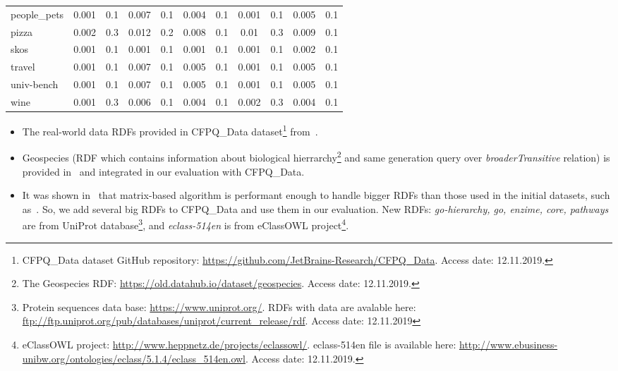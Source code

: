 {\begin{table*}[h]
\begin{tabular}{| l | c  c | c  c | c  c | c  c | c  c |}
people\_pets                & 0.001 & 0.1  & 0.007 & 0.1 & 0.004 & 0.1   & 0.001 & 0.1  & 0.005 & 0.1   \\
pizza                       & 0.002 & 0.3  & 0.012 & 0.2 & 0.008 & 0.1   & 0.01  & 0.3  & 0.009 & 0.1   \\
skos                        & 0.001 & 0.1  & 0.001 & 0.1 & 0.001 & 0.1   & 0.001 & 0.1  & 0.002 & 0.1   \\
travel                      & 0.001 & 0.1  & 0.007 & 0.1 & 0.005 & 0.1   & 0.001 & 0.1  & 0.005 & 0.1   \\
univ-bench                  & 0.001 & 0.1  & 0.007 & 0.1 & 0.005 & 0.1   & 0.001 & 0.1  & 0.005 & 0.1   \\
wine                        & 0.001 & 0.3  & 0.006 & 0.1 & 0.004 & 0.1   & 0.002 & 0.3  & 0.004 & 0.1  \\
    \hline
  \end{tabular}
\end{table*}
}

\begin{itemize}
\item The real-world data RDFs provided in CFPQ\_Data dataset\footnote{CFPQ\_Data dataset GitHub repository: \url{https://github.com/JetBrains-Research/CFPQ_Data}. Access date: 12.11.2019.} from~\cite{Mishin:2019:ECP:3327964.3328503}.
\item Geospecies (RDF which contains information about biological hierrarchy\footnote{The Geospecies RDF: \url{https://old.datahub.io/dataset/geospecies}. Access date: 12.11.2019.} and same generation query over \textit{broaderTransitive} relation) is provided in~\cite{Kuijpers:2019:ESC:3335783.3335791} and integrated in our evaluation with CFPQ\_Data.
\item It was shown in~\cite{Mishin:2019:ECP:3327964.3328503} that matrix-based algorithm is performant enough to handle bigger RDFs than those used in the initial datasets, such as~\cite{RDF}.
So, we add several big RDFs to CFPQ\_Data and use them in our evaluation.
New RDFs: \textit{go-hierarchy, go, enzime, core, pathways} are from UniProt database\footnote{Protein sequences data base: \url{https://www.uniprot.org/}. RDFs with data are avalable here: \url{ftp://ftp.uniprot.org/pub/databases/uniprot/current_release/rdf}. Access date: 12.11.2019}, and \textit{eclass-514en} is from eClassOWL project\footnote{eClassOWL project: \url{http://www.heppnetz.de/projects/eclassowl/}. eclass-514en file is available here: \url{http://www.ebusiness-unibw.org/ontologies/eclass/5.1.4/eclass_514en.owl}. Access date: 12.11.2019.}.
\end{itemize}


